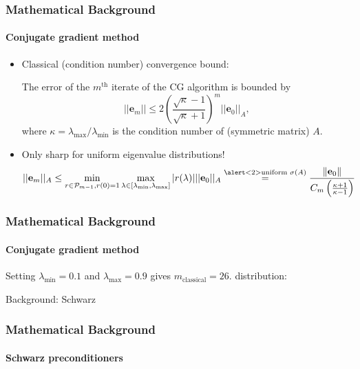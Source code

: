 \begin{frame}[label=background,fragile]
    \frametitle{Mathematical Background}
    \framesubtitle{Conjugate gradient method}
    \begin{itemize}
        \item<1-> Classical (condition number) convergence bound:
        \begin{theorem}
            The error of the $m^{\text{th}}$ iterate of the CG algorithm is bounded by
            \begin{equation*}
            ||\mathbf{e}_m|| \leq 2 \left(\frac{\sqrt{\kappa}-1}{\sqrt{\kappa} + 1}\right)^m ||\mathbf{e}_0||_A,
            \end{equation*}
            where $\kappa = \lambda_{\text{max}}/\lambda_{\text{min}}$ is the condition number of (symmetric matrix) $A$.
        \end{theorem}
        \item<2-> Only sharp for \alert<2>{uniform} eigenvalue distributions!
        \begin{equation*}
            ||\mathbf{e}_m||_A \leq \min_{r \in \mathcal{P}_{m-1}, r(0) = 1} \max_{\lambda \in [\lambda_{\text{min}}, \lambda_{\text{max}}]} |r(\lambda)| ||\mathbf{e}_0||_A \overset{\alert<2>{\text{uniform } \sigma(A)}}{=} \frac{\|\mathbf{e}_0\|}{C_m\left(\frac{\kappa + 1}{\kappa - 1}\right)}
        \end{equation*}
    \end{itemize}
\end{frame}

\begin{frame}[label=background,fragile]
    \frametitle{Mathematical Background}
    \framesubtitle{Conjugate gradient method}
    Setting $\lambda_{\text{min}} = 0.1$ and $\lambda_{\text{max}} = 0.9$ gives $m_{\text{classical}} = 26$.  distribution:
\end{frame}


\begin{frame}[label=background,fragile]{Background: Schwarz}
    \frametitle{Mathematical Background}
    \framesubtitle{Schwarz preconditioners}

\end{frame}